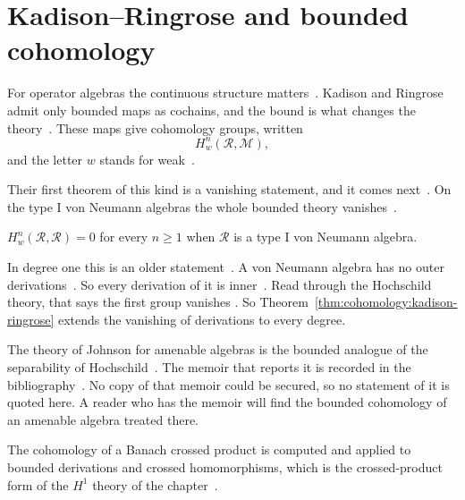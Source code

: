 \section{Kadison--Ringrose and bounded cohomology}\label{sec:cohomology:bounded-cohomology}

For operator algebras the continuous structure
matters~\cite[pp.~227--228]{KadisonRingrose1971}. Kadison and Ringrose admit
only bounded maps as cochains, and the bound is what changes the
theory~\cite[pp.~227--228]{KadisonRingrose1971}. These maps give cohomology
groups, written
\[
  H_w^n(\mathcal{R}, \mathcal{M}),
\]
and the letter $w$ stands for weak~\cite[pp.~227--228]{KadisonRingrose1971}.

Their first theorem of this kind is a vanishing statement, and it comes
next~\cite[Theorem~4.4, p.~239]{KadisonRingrose1971}. On the type I von Neumann
algebras the whole bounded theory
vanishes~\cite[Theorem~4.4, p.~239]{KadisonRingrose1971}.

\begin{theorem}\label{thm:cohomology:kadison-ringrose}
$H_w^n(\mathcal{R}, \mathcal{R}) = 0$ for every $n \ge 1$ when $\mathcal{R}$ is a
type I von Neumann algebra.
\end{theorem}

In degree one this is an older
statement~\cite[pp.~227--228]{KadisonRingrose1971}. A von Neumann algebra has no
outer derivations~\cite[pp.~227--228]{KadisonRingrose1971}. So every derivation
of it is inner~\cite[pp.~227--228]{KadisonRingrose1971}. Read through the
Hochschild theory, that says the first group vanishes
\cite[pp.~227--228]{KadisonRingrose1971}. So
Theorem~\ref{thm:cohomology:kadison-ringrose} extends the vanishing of
derivations to every degree.

The theory of Johnson for amenable algebras is the bounded analogue of the
separability of Hochschild~\cite[pp.~227--228]{KadisonRingrose1971}.
The memoir that reports it is recorded in the bibliography~\cite{Johnson1972}.
No copy of that memoir could be secured, so no statement of it is quoted here.
A reader who has the memoir will find the bounded cohomology of an amenable
algebra treated there.

The cohomology of a Banach crossed product is computed and applied to bounded derivations and crossed homomorphisms, which is the crossed-product form of the $H^1$ theory of the chapter~\cite{WlCohomologyOverBanachCrossedPro1979}.

